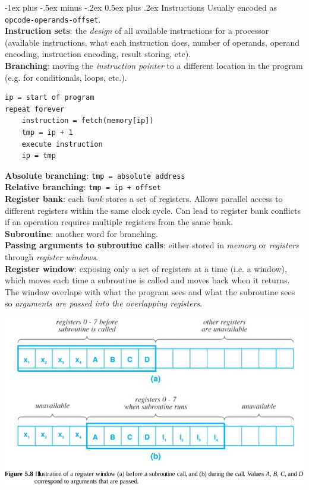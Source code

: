 \documentclass[10pt,landscape]{article}
\makeatletter
\renewcommand{\section}{\@startsection{section}{1}{0mm}%
                                {-1ex plus -.5ex minus -.2ex}%
                                {0.5ex plus .2ex}%
                                {\normalfont\large\bfseries}}
\makeatother
\begin{document}
\begin{multicols}{3}
\section{Instructions}
Usually encoded as \texttt{opcode-operands-offset}.\\
\textbf{Instruction sets}: the \textit{design} of all available instructions for a processor (available instructions, what each instruction does, number of operands, operand encoding, instruction encoding, result storing, etc).\\
\textbf{Branching}: moving the \textit{instruction pointer} to a different location in the program (e.g. for conditionals, loops, etc.).
\begin{verbatim}
ip = start of program
repeat forever
    instruction = fetch(memory[ip])
    tmp = ip + 1
    execute instruction
    ip = tmp
\end{verbatim}
\textbf{Absolute branching}: \texttt{tmp = absolute address}\\
\textbf{Relative branching}: \texttt{tmp = ip + offset}\\
\textbf{Register bank}: each \textit{bank} stores a set of registers. Allows parallel access to different registers within the same clock cycle. Can lead to register bank conflicts if an operation requires multiple registers from the same bank. \\
\textbf{Subroutine}: another word for branching. \\
\textbf{Passing arguments to subroutine calls}: either stored in \textit{memory} or \textit{registers} through \textit{register windows}.\\
\textbf{Register window}: exposing only a set of registers at a time (i.e. a window), which moves each time a subroutine is called and moves back when it returns. The window overlaps with what the program sees and what the subroutine sees so \textit{arguments are passed into the overlapping registers}.\\
{\centering \includegraphics[scale=0.4]{img/rw.png}\par}

\end{multicols}
\end{document}
